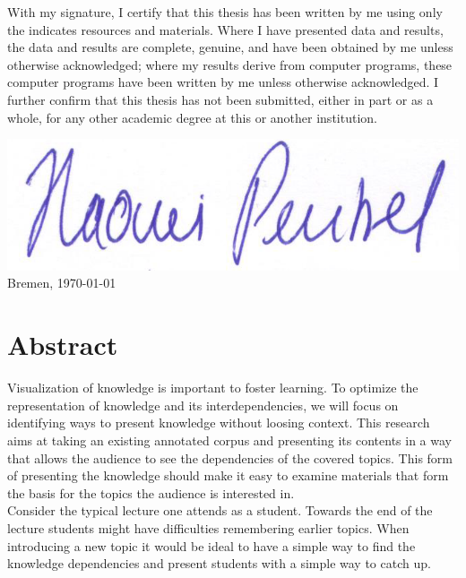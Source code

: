 \documentclass[twoside]{article}
\begin{document}
\newpage
\noindent
  With my signature, I certify that this thesis has been written by me
  using only the indicates resources and materials. Where I have
  presented data and results, the data and results are complete,
  genuine, and have been obtained by me unless otherwise acknowledged;
  where my results derive from computer programs, these computer
  programs have been written by me unless otherwise acknowledged. I
  further confirm that this thesis has not been submitted, either in
  part or as a whole, for any other academic degree at this or another
  institution.

  \vspace{20mm}

    \includegraphics[scale=0.2]{Signature}
 \hfill Bremen, \today
  
\newpage

\thispagestyle{fancy} %


 \section*{Abstract}
Visualization of knowledge is important to foster learning. To optimize the representation of knowledge and its interdependencies, we will focus on identifying ways to present knowledge without loosing context. This research aims at taking an existing annotated corpus and presenting its contents in a way that allows the audience to see the dependencies of the covered topics. This form of presenting the knowledge should make it easy to examine materials that form the basis for the topics the audience is interested in.\\

Consider the typical lecture one attends as a student. Towards the end of the lecture students might have difficulties remembering earlier topics. When introducing a new topic it would be ideal to have a simple way to find the knowledge dependencies and present students with a simple way to catch up.\\
\end{document}
